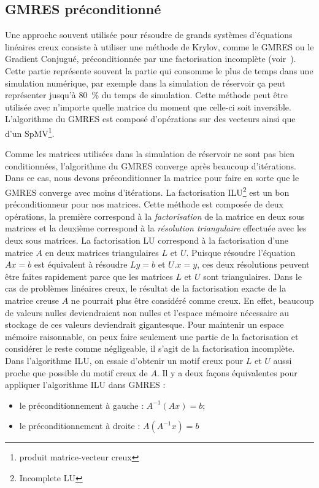 \subsection{GMRES préconditionné}
Une approche souvent utilisée pour résoudre de grands systèmes d'équations linéaires creux consiste à utiliser une méthode de Krylov, comme le GMRES ou le Gradient Conjugué, préconditionnée par une factorisation incomplète (voir~\cite{Saad96IMSLS}).
%
Cette partie représente souvent la partie qui consomme le plus de temps dans une simulation numérique, par exemple dans la simulation de réservoir ça peut représenter jusqu'à 80~\% du temps de simulation.
%
Cette méthode peut être utilisée avec n'importe quelle matrice du moment que celle-ci soit inversible.
%
L'algorithme du GMRES est composé d'opérations sur des vecteurs ainsi que d'un SpMV\footnote{produit matrice-vecteur creux}.

Comme les matrices utilisées dans la simulation de réservoir ne sont pas bien conditionnées, l'algorithme du GMRES converge après beaucoup d'itérations.
%
Dans ce cas, nous devons préconditionner la matrice pour faire en sorte que le GMRES converge avec moins d'itérations.
%
La factorisation ILU\footnote{Incomplete LU} est un bon préconditionneur pour nos matrices.
%
Cette méthode est composée de deux opérations, la première correspond à la {\em factorisation} de la matrice en deux sous matrices et la deuxième correspond à la {\em résolution triangulaire} effectuée avec les deux sous matrices.
%
La factorisation LU correspond à la factorisation d'une matrice $A$ en deux matrices triangulaires $L$ et $U$.
%
Puisque résoudre l'équation $Ax=b$ est équivalent à résoudre $Ly=b$ et $U.x=y$, ces deux résolutions peuvent être faites rapidement parce que les matrices $L$ et $U$ sont triangulaires.
%
Dans le cas de problèmes linéaires creux, le résultat de la factorisation exacte de la matrice creuse $A$ ne pourrait plus être considéré comme creux.
%
En effet, beaucoup de valeurs nulles deviendraient non nulles et l'espace mémoire nécessaire au stockage de ces valeurs deviendrait gigantesque.
%
Pour maintenir un espace mémoire raisonnable, on peux faire seulement une partie de la factorisation et considérer le reste comme négligeable, il s'agit de la factorisation incomplète.
%
Dans l'algorithme ILU, on essaie d'obtenir un motif creux pour $L$ et $U$ aussi proche que possible du motif creux de $A$.
%
Il y a deux façons équivalentes pour appliquer l'algorithme ILU dans GMRES :
\begin{itemize}
  \item le préconditionnement à gauche : $A^{-1}(Ax)=b$;
  \item le préconditionnement à droite : $A(A^{-1}x)=b$
\end{itemize}
%
